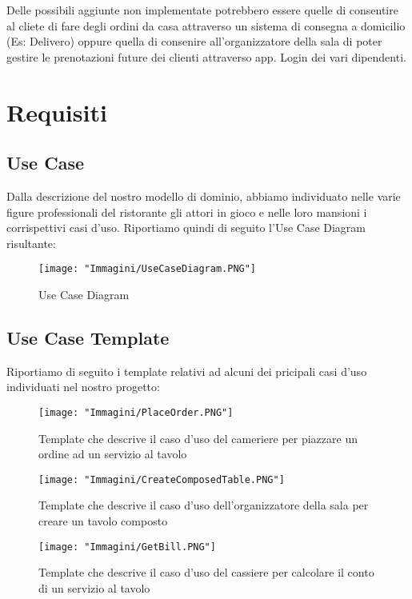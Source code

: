 \documentclass{article}
\begin{document}
Delle possibili aggiunte non implementate potrebbero essere quelle di consentire al cliete di fare degli ordini da casa attraverso un sistema di consegna a domicilio (Es: Delivero) oppure quella di consenire all'organizzatore della sala di poter gestire le prenotazioni future dei clienti attraverso app. Login dei vari dipendenti. 


\section{Requisiti}
\subsection{Use Case}
Dalla descrizione del nostro modello di dominio, abbiamo individuato nelle varie figure professionali del ristorante gli attori in gioco e nelle loro mansioni i corrispettivi casi d'uso. Riportiamo quindi di seguito l'Use Case Diagram risultante:

\begin{figure}[!h]
\centering
\texttt{[image: "Immagini/UseCaseDiagram.PNG"]}
\caption{Use Case Diagram}
\end{figure}

\newpage

\subsection{Use Case Template}
Riportiamo di seguito i template relativi ad alcuni dei pricipali casi d'uso individuati nel nostro progetto:

\begin{figure}[!h]
\centering
\texttt{[image: "Immagini/PlaceOrder.PNG"]}
\caption{Template che descrive il caso d'uso del cameriere per piazzare un ordine ad un servizio al tavolo}
\end{figure}

\begin{figure}[!h]
\centering
\texttt{[image: "Immagini/CreateComposedTable.PNG"]}
\caption{Template che descrive il caso d'uso dell'organizzatore della sala per creare un tavolo composto}
\end{figure}

\newpage

\begin{figure}[!h]
\centering
\texttt{[image: "Immagini/GetBill.PNG"]}
\caption{Template che descrive il caso d'uso del cassiere per calcolare il conto di un servizio al tavolo}
\end{figure}
\end{document}
